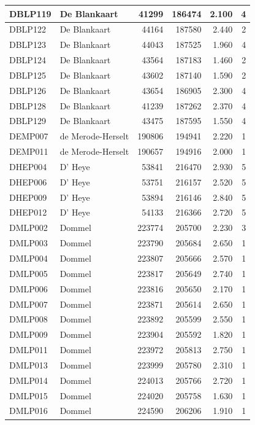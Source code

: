 \documentclass[11pt,]{book}
\begin{document}
\begin{table}
\begin{tabular}[t]{l|l|r|r|r|r}
\hline
DBLP119 & De Blankaart & 41299 & 186474 & 2.100 & 4\\
\hline
DBLP122 & De Blankaart & 44164 & 187580 & 2.440 & 2\\
\hline
DBLP123 & De Blankaart & 44043 & 187525 & 1.960 & 4\\
\hline
DBLP124 & De Blankaart & 43564 & 187183 & 1.460 & 2\\
\hline
DBLP125 & De Blankaart & 43602 & 187140 & 1.590 & 2\\
\hline
DBLP126 & De Blankaart & 43654 & 186905 & 2.300 & 4\\
\hline
DBLP128 & De Blankaart & 41239 & 187262 & 2.370 & 4\\
\hline
DBLP129 & De Blankaart & 43475 & 187595 & 1.550 & 4\\
\hline
DEMP007 & de Merode-Herselt & 190806 & 194941 & 2.220 & 1\\
\hline
DEMP011 & de Merode-Herselt & 190657 & 194916 & 2.000 & 1\\
\hline
DHEP004 & D' Heye & 53841 & 216470 & 2.930 & 5\\
\hline
DHEP006 & D' Heye & 53751 & 216157 & 2.520 & 5\\
\hline
DHEP009 & D' Heye & 53894 & 216146 & 2.840 & 5\\
\hline
DHEP012 & D' Heye & 54133 & 216366 & 2.720 & 5\\
\hline
DMLP002 & Dommel & 223774 & 205700 & 2.230 & 3\\
\hline
DMLP003 & Dommel & 223790 & 205684 & 2.650 & 1\\
\hline
DMLP004 & Dommel & 223807 & 205666 & 2.570 & 1\\
\hline
DMLP005 & Dommel & 223817 & 205649 & 2.740 & 1\\
\hline
DMLP006 & Dommel & 223816 & 205650 & 2.170 & 1\\
\hline
DMLP007 & Dommel & 223871 & 205614 & 2.650 & 1\\
\hline
DMLP008 & Dommel & 223892 & 205599 & 2.550 & 1\\
\hline
DMLP009 & Dommel & 223904 & 205592 & 1.820 & 1\\
\hline
DMLP011 & Dommel & 223972 & 205813 & 2.750 & 1\\
\hline
DMLP013 & Dommel & 223999 & 205780 & 2.310 & 1\\
\hline
DMLP014 & Dommel & 224013 & 205766 & 2.720 & 1\\
\hline
DMLP015 & Dommel & 224020 & 205758 & 1.630 & 1\\
\hline
DMLP016 & Dommel & 224590 & 206206 & 1.910 & 1\\

\end{tabular}
\end{table}
\end{document}
